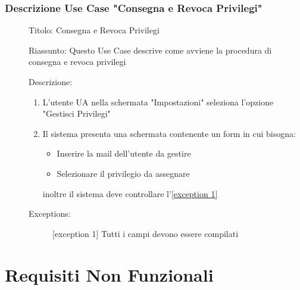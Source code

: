 \documentclass{article}
\let\origthesubsection\thesubsection
\begin{document}
\subsubsection*{Descrizione Use Case "Consegna e Revoca Privilegi"}
\begin{description}
    \item[] Titolo: Consegna e Revoca Privilegi
    \item[] Riassunto: Questo Use Case descrive come avviene la procedura di consegna e revoca privilegi
    \item[] Descrizione:
        \begin{enumerate}
            \item L'utente UA nella schermata "Impostazioni" seleziona l'opzione "Gestisci Privilegi"
            \item Il sistema presenta una schermata contenente un form in cui bisogna:
                  \begin{itemize}
                      \item Inserire la mail dell'utente da gestire
                      \item Selezionare il privilegio da assegnare
                  \end{itemize}
                  inoltre il sistema deve controllare l'\hyperref[exc:15.1]{[exception 1]}
        \end{enumerate}
    \item[] Exceptions:
        \begin{description}
            \item[] \label{exc:15.1} [exception 1] Tutti i campi devono essere compilati
        \end{description}
\end{description}
\renewcommand\thesubsection{\origthesubsection}
\clearpage
\section{Requisiti Non Funzionali}
\renewcommand\thesubsection{}
\end{document}
